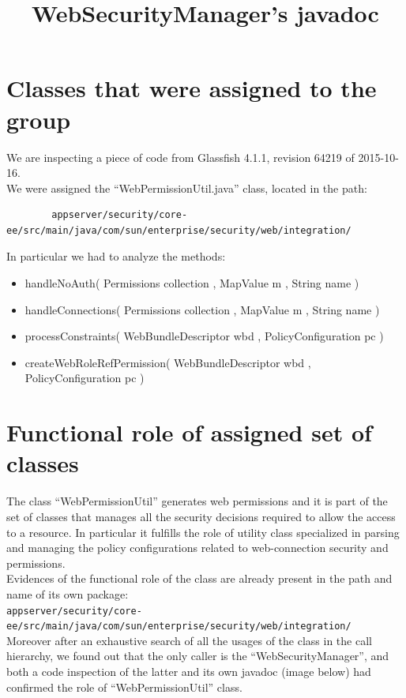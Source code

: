 \documentclass[a4paper,11pt]{report} %
\begin{document}
	\section{Classes that were assigned to the group} 
	We are inspecting a piece of code from Glassfish 4.1.1, revision 64219 of 2015-10-16.\\ \smallskip
	We were assigned the ``WebPermissionUtil.java'' class, located in the path:\
	\begin{verbatim}
		appserver/security/core-ee/src/main/java/com/sun/enterprise/security/web/integration/
	\end{verbatim}
	\bigskip
	In particular we had to analyze the methods:
	\begin{itemize}
		\item handleNoAuth( Permissions collection , MapValue m , String name )
		\item handleConnections( Permissions collection , MapValue m , String name )
		\item processConstraints( WebBundleDescriptor wbd , PolicyConfiguration pc )
		\item createWebRoleRefPermission( WebBundleDescriptor wbd , PolicyConfiguration pc )
	\end{itemize}
	
	\section{Functional role of assigned set of classes} 
	The class ``WebPermissionUtil'' generates web permissions and it is part of the set of classes that manages all the security decisions required to allow the access to a resource. In particular it fulfills the role of utility class specialized in parsing and managing the policy configurations related to web-connection security and permissions.\smallskip\\
	Evidences of the functional role of the class are already present in the path and name of its own package:\\
	\texttt{appserver/security/core-ee/src/main/java/com/sun/enterprise/security/web/integration/}\bigskip \\ 
	Moreover after an exhaustive search of all the usages of the class in the call hierarchy, we found out that the only caller is the ``WebSecurityManager'', and both a code inspection of the latter and its own javadoc (image below) had confirmed the role of ``WebPermissionUtil'' class.
	\begin{minipage}{\linewidth}
		\centering
		\title{WebSecurityManager's javadoc}\smallskip\\
	\end{minipage} \linebreak
	
\end{document}
